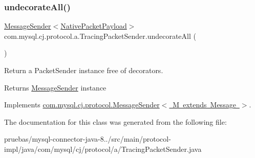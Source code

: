 \subsubsection{\texorpdfstring{undecorate\+All()}{undecorateAll()}}
{\footnotesize\ttfamily \mbox{\hyperlink{interfacecom_1_1mysql_1_1cj_1_1protocol_1_1_message_sender}{Message\+Sender}}$<$\mbox{\hyperlink{classcom_1_1mysql_1_1cj_1_1protocol_1_1a_1_1_native_packet_payload}{Native\+Packet\+Payload}}$>$ com.\+mysql.\+cj.\+protocol.\+a.\+Tracing\+Packet\+Sender.\+undecorate\+All (\begin{DoxyParamCaption}{ }\end{DoxyParamCaption})}

Return a Packet\+Sender instance free of decorators.

\begin{DoxyReturn}{Returns}
\mbox{\hyperlink{interfacecom_1_1mysql_1_1cj_1_1protocol_1_1_message_sender}{Message\+Sender}} instance 
\end{DoxyReturn}


Implements \mbox{\hyperlink{interfacecom_1_1mysql_1_1cj_1_1protocol_1_1_message_sender_a8066931f03c2fa9cc705716fa10a4517}{com.\+mysql.\+cj.\+protocol.\+Message\+Sender$<$ M extends Message $>$}}.



The documentation for this class was generated from the following file\+:\begin{DoxyCompactItemize}
\item 
pruebas/mysql-\/connector-\/java-\/8../src/main/protocol-\/impl/java/com/mysql/cj/protocol/a/Tracing\+Packet\+Sender.\+java\end{DoxyCompactItemize}
